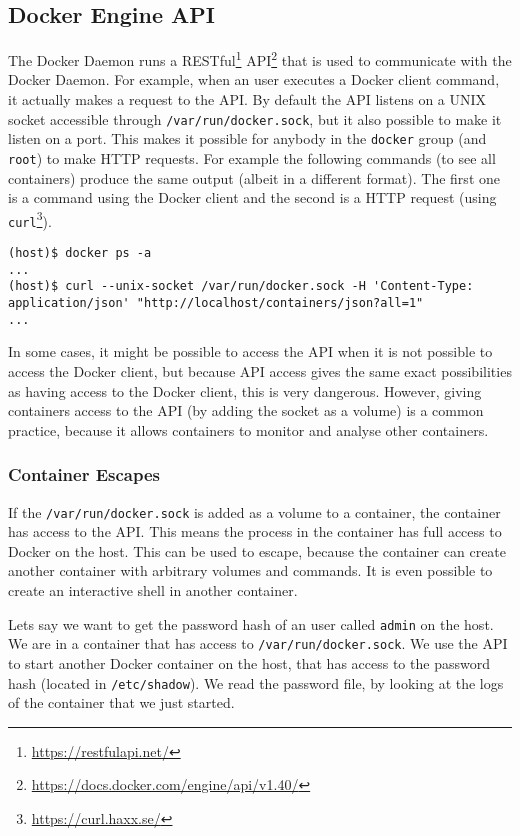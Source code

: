 \subsection{Docker Engine API}
The Docker Daemon runs a RESTful\footnote{\url{https://restfulapi.net/}} API\footnote{\url{https://docs.docker.com/engine/api/v1.40/}} that is used to communicate with the Docker Daemon. For example, when an user executes a Docker client command, it actually makes a request to the API. By default the API listens on a UNIX socket accessible through \lstinline{/var/run/docker.sock}, but it also possible to make it listen on a port. This makes it possible for anybody in the \lstinline{docker} group (and \lstinline{root}) to make HTTP requests. For example the following commands (to see all containers) produce the same output (albeit in a different format). The first one is a command using the Docker client and the second is a HTTP request (using \lstinline{curl}\footnote{\url{https://curl.haxx.se/}}).
\begin{lstlisting}[caption={Docker client and Socket},captionpos=b]
(host)$ docker ps -a
...
(host)$ curl --unix-socket /var/run/docker.sock -H 'Content-Type: application/json' "http://localhost/containers/json?all=1"
...
\end{lstlisting}

\hfill

In some cases, it might be possible to access the API when it is not possible to access the Docker client, but because API access gives the same exact possibilities as having access to the Docker client, this is very dangerous\cite{The-Dangers-Of-Docker-Sock}.
However, giving containers access to the API (by adding the socket as a volume) is a common practice, because it allows containers to monitor and analyse other containers.

\subsubsection{Container Escapes}
If the \lstinline{/var/run/docker.sock} is added as a volume to a container, the container has access to the API. This means the process in the container has full access to Docker on the host. This can be used to escape, because the container can create another container with arbitrary volumes and commands. It is even possible to create an interactive shell in another container\cite{Escape-Socket-Shell}.

\hfill

Lets say we want to get the password hash of an user called \lstinline{admin} on the host. We are in a container that has access to \lstinline{/var/run/docker.sock}. We use the API to start another Docker container on the host, that has access to the password hash (located in \lstinline{/etc/shadow}). We read the password file, by looking at the logs of the container that we just started.

